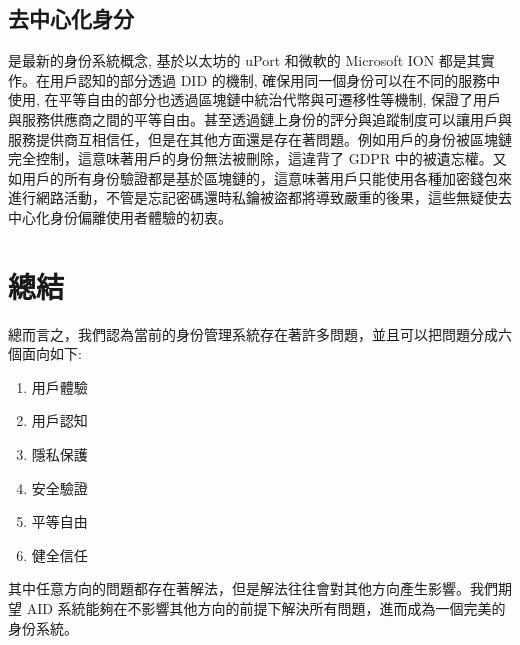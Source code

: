 \subsection{去中心化身分}
是最新的身份系統概念, 基於以太坊的 uPort 和微軟的 Microsoft ION 都是其實作。在用戶認知的部分透過 DID 的機制, 確保用同一個身份可以在不同的服務中使用, 在平等自由的部分也透過區塊鏈中統治代幣與可遷移性等機制, 保證了用戶與服務供應商之間的平等自由。甚至透過鏈上身份的評分與追蹤制度可以讓用戶與服務提供商互相信任，但是在其他方面還是存在著問題。例如用戶的身份被區塊鏈完全控制，這意味著用戶的身份無法被刪除，這違背了 GDPR 中的被遺忘權。又如用戶的所有身份驗證都是基於區塊鏈的，這意味著用戶只能使用各種加密錢包來進行網路活動，不管是忘記密碼還時私鑰被盜都將導致嚴重的後果，這些無疑使去中心化身份偏離使用者體驗的初衷。
\section{總結}
總而言之，我們認為當前的身份管理系統存在著許多問題，並且可以把問題分成六個面向如下:
\begin{enumerate}
  \item 用戶體驗
  \item 用戶認知
  \item 隱私保護
  \item 安全驗證
  \item 平等自由
  \item 健全信任
\end{enumerate}
其中任意方向的問題都存在著解法，但是解法往往會對其他方向產生影響。我們期望 AID 系統能夠在不影響其他方向的前提下解決所有問題，進而成為一個完美的身份系統。
